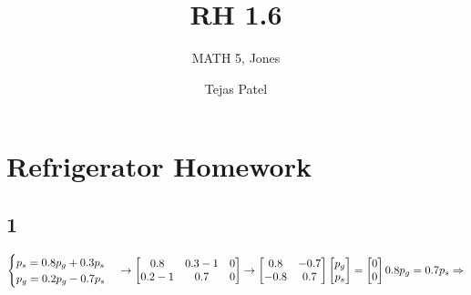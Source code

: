 \documentclass{article}
\title{RH 1.6}
\author{MATH 5, Jones}
\date{Tejas Patel}
\begin{document}
\maketitle
\section*{Refrigerator Homework}
\subsection*{1}
$\begin{cases}p_s=0.8p_g+0.3p_s\\ p_g=0.2p_g-0.7p_s\end{cases}\rightarrow\begin{bmatrix}0.8& 0.3-1&0\\0.2-1&0.7&0\end{bmatrix}\rightarrow\begin{bmatrix}0.8& -0.7\\-0.8&0.7\end{bmatrix}\begin{bmatrix}p_g\\p_s\end{bmatrix} = \begin{bmatrix}0\\0\end{bmatrix}\\[0.1in]0.8p_g=0.7p_s \Rightarrow $
\end{document}
